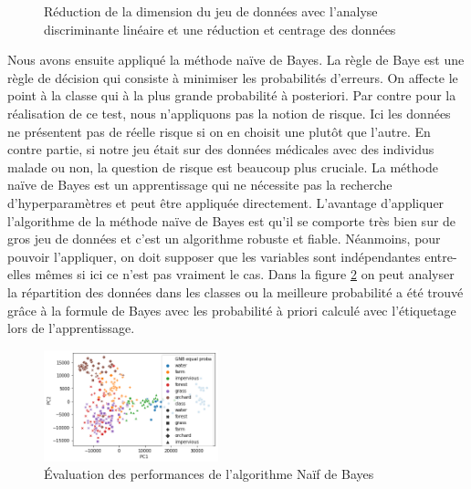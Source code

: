 \documentclass[twocolumn,10pt]{article}
\begin{document}
\begin{figure}[htbp]
\centering
    \qquad
    \caption{Réduction de la dimension du jeu de données avec l'analyse discriminante linéaire et une réduction et centrage des données}%
    \label{fig:LDA}%
\end{figure}

Nous avons ensuite appliqué la méthode naïve de Bayes. La règle de Baye est une règle de décision qui consiste à minimiser les probabilités d'erreurs. On affecte le point à la classe qui à la plus grande probabilité à posteriori. Par contre pour la réalisation de ce test, nous n'appliquons pas la notion de risque. Ici les données ne présentent pas de réelle risque si on en choisit une plutôt que l'autre. En contre partie, si notre jeu était sur des données médicales avec des individus malade ou non, la question de risque est beaucoup plus cruciale. La méthode naïve de Bayes est un apprentissage qui ne nécessite pas la recherche d'hyperparamètres et peut être appliquée directement. L'avantage d'appliquer l'algorithme de la méthode naïve de Bayes est qu'il se comporte très bien sur de gros jeu de données et c'est un algorithme robuste et fiable. Néanmoins, pour pouvoir l'appliquer, on doit supposer que les variables sont indépendantes entre-elles mêmes si ici ce n'est pas vraiment le cas. Dans la figure \ref{fig:NaiveBayes} on peut analyser la répartition des données dans les classes ou la meilleure probabilité a été trouvé grâce à la formule de Bayes avec les probabilité à priori calculé avec l'étiquetage lors de l'apprentissage. 

\begin{figure}[htbp]
\begin{center}
\includegraphics[width=0.45\textwidth]{figures/LDA-QDA-Naive/NaiveBayes.png}
\caption{\label{fig:NaiveBayes}Évaluation des performances de l'algorithme Naïf de Bayes}
\end{center}
\end{figure}
\end{document}
